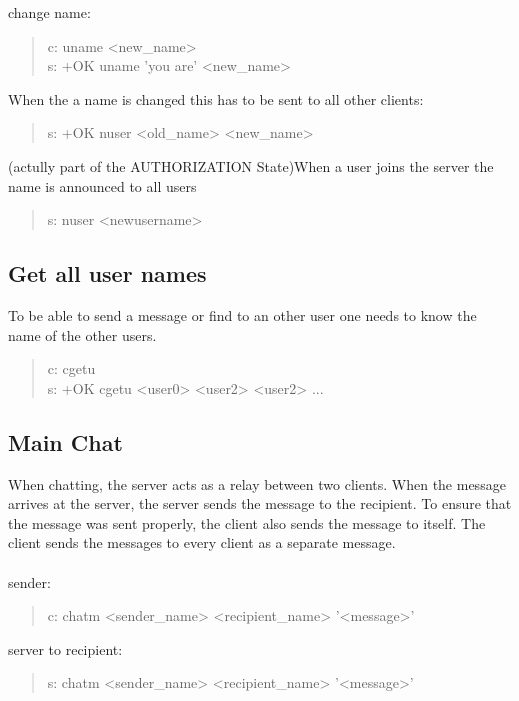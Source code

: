 \documentclass[a4paper,11pt]{article}
\begin{document}
\noindent
change name:
\begin{quote}
  c: uname <new\_name>\\
  s: +OK uname 'you are' <new\_name>
\end{quote}

\noindent
When the a name is changed this has to be sent to all other clients:\\
\begin{quote}
  s: +OK nuser <old\_name> <new\_name>
\end{quote}

\noindent
(actully part of the AUTHORIZATION State)When a user joins the server the name is announced to all users
\begin{quote}
  s: nuser <newusername> 
\end{quote}


\subsection{Get all user names}
To be able to send a message or find to an other user one needs to know the name of the other users.
\begin{quote}
  c: cgetu\\
  s: +OK cgetu <user0> <user2> <user2> ...
\end{quote} 

\subsection{Main Chat}
When chatting, the server acts as a relay between two clients. When the message arrives at the server, the server sends the message to the recipient. To ensure that the message was sent properly, the client also sends the message to itself. The client sends the messages to every client as a separate message.\\\\

\noindent
sender:
\begin{quote}
  c: chatm <sender\_name> <recipient\_name> '<message>'\\ %
\end{quote}

\noindent
server to recipient:
\begin{quote}
  s: chatm <sender\_name> <recipient\_name> '<message>'\\ %
\end{quote}
\end{document}

